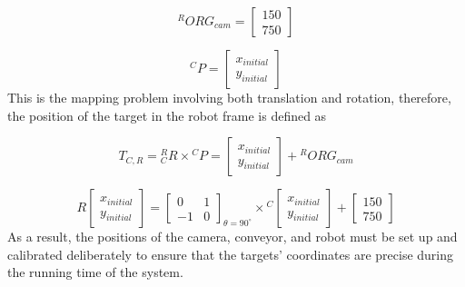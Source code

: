 \documentclass[10pt, letterpaper]{article}
\begin{document}
    \begin{equation} \label{eq13} 
        {}^{R}ORG_{cam} = 
        \begin{bmatrix}
            150\\750
        \end{bmatrix}
    \end{equation}

    \begin{equation} \label{eq14} 
        {}^{C}P = 
        \begin{bmatrix}
            x_{initial}\\y_{initial}
        \end{bmatrix}
    \end{equation}
    This is the mapping problem involving both translation and rotation, therefore, the position of the target in the robot frame is defined as\par
    \begin{equation} \label{eq15} 
        T_{C,R} = {}^{R}_{C}R \times {}^{C}P = 
        \begin{bmatrix}
            x_{initial}\\y_{initial}
        \end{bmatrix}
        + {}^{R}ORG_{cam}
    \end{equation}

    \begin{equation} \label{eq16} R
        \begin{bmatrix}
            x_{initial}\\y_{initial}
        \end{bmatrix}
        =
        \begin{bmatrix}
            0 & 1\\
            -1 & 0
        \end{bmatrix}_{\theta = 90^{\circ}}
        \times {}^{C}
        \begin{bmatrix}
            x_{initial}\\y_{initial}
        \end{bmatrix}
        +
        \begin{bmatrix}
            150\\750
        \end{bmatrix}
    \end{equation}
    As a result, the positions of the camera, conveyor, and robot must be set up and calibrated deliberately to ensure that the targets’ coordinates are precise during the running time of the system.\par
\end{document}
